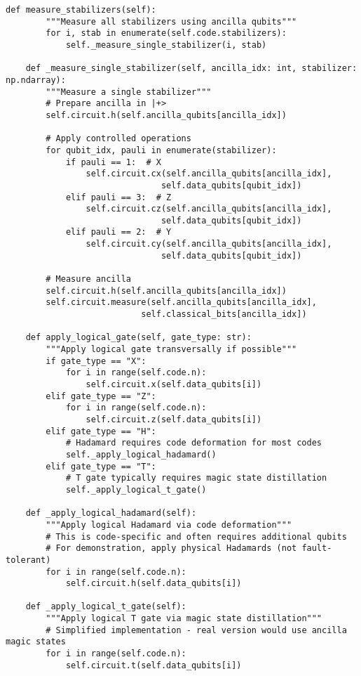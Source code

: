 \documentclass[12pt,a4paper]{article}
\begin{document}
\begin{lstlisting}[style=python,caption=Quantum circuit implementations using Qiskit]
    def measure_stabilizers(self):
        """Measure all stabilizers using ancilla qubits"""
        for i, stab in enumerate(self.code.stabilizers):
            self._measure_single_stabilizer(i, stab)
    
    def _measure_single_stabilizer(self, ancilla_idx: int, stabilizer: np.ndarray):
        """Measure a single stabilizer"""
        # Prepare ancilla in |+>
        self.circuit.h(self.ancilla_qubits[ancilla_idx])
        
        # Apply controlled operations
        for qubit_idx, pauli in enumerate(stabilizer):
            if pauli == 1:  # X
                self.circuit.cx(self.ancilla_qubits[ancilla_idx], 
                               self.data_qubits[qubit_idx])
            elif pauli == 3:  # Z
                self.circuit.cz(self.ancilla_qubits[ancilla_idx], 
                               self.data_qubits[qubit_idx])
            elif pauli == 2:  # Y
                self.circuit.cy(self.ancilla_qubits[ancilla_idx], 
                               self.data_qubits[qubit_idx])
        
        # Measure ancilla
        self.circuit.h(self.ancilla_qubits[ancilla_idx])
        self.circuit.measure(self.ancilla_qubits[ancilla_idx], 
                           self.classical_bits[ancilla_idx])
    
    def apply_logical_gate(self, gate_type: str):
        """Apply logical gate transversally if possible"""
        if gate_type == "X":
            for i in range(self.code.n):
                self.circuit.x(self.data_qubits[i])
        elif gate_type == "Z":
            for i in range(self.code.n):
                self.circuit.z(self.data_qubits[i])
        elif gate_type == "H":
            # Hadamard requires code deformation for most codes
            self._apply_logical_hadamard()
        elif gate_type == "T":
            # T gate typically requires magic state distillation
            self._apply_logical_t_gate()
    
    def _apply_logical_hadamard(self):
        """Apply logical Hadamard via code deformation"""
        # This is code-specific and often requires additional qubits
        # For demonstration, apply physical Hadamards (not fault-tolerant)
        for i in range(self.code.n):
            self.circuit.h(self.data_qubits[i])
    
    def _apply_logical_t_gate(self):
        """Apply logical T gate via magic state distillation"""
        # Simplified implementation - real version would use ancilla magic states
        for i in range(self.code.n):
            self.circuit.t(self.data_qubits[i])
    

\end{lstlisting}
\end{document}
